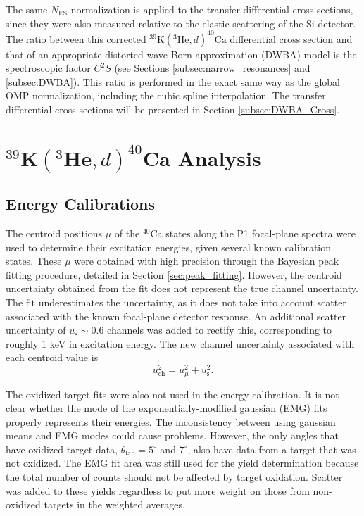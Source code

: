 The same $N_{\mathrm{ES}}$ normalization is applied to the transfer differential cross sections, since they were also measured relative to the elastic scattering of the Si detector. The ratio between this corrected $^{39}\mathrm{K}(^{3}\mathrm{He}, d)^{40}\mathrm{Ca}$ differential cross section and that of an appropriate distorted-wave Born approximation (DWBA) model is the spectroscopic factor $C^{2}S$ (see Sections \ref{subsec:narrow_resonances} and \ref{subsec:DWBA}). This ratio is performed in the exact same way as the global OMP normalization, including the cubic spline interpolation. The transfer differential cross sections will be presented in Section \ref{subsec:DWBA_Cross}.

\section{$^{39}\mathrm{\textbf{K}}(^{3}\mathrm{\textbf{He}},d)^{40}\mathrm{\textbf{Ca}}$ Analysis}

\subsection{Energy Calibrations} \label{subsec:cal}

The centroid positions $\mu$ of the $^{40}$Ca states along the P1 focal-plane spectra were used to determine their excitation energies, given several known calibration states. These $\mu$ were obtained with high precision through the Bayesian peak fitting procedure, detailed in Section \ref{sec:peak_fitting}. However, the centroid uncertainty obtained from the fit does not represent the true channel uncertainty. The fit underestimates the uncertainty, as it does not take into account scatter associated with the known focal-plane detector response. An additional scatter uncertainty of $u_{\mathrm{s}} \sim 0.6$ channels was added to rectify this, corresponding to roughly 1 keV in excitation energy. The new channel uncertainty associated with each centroid value is
\begin{equation}
u_{\mathrm{ch}}^{2} = u_{\mu}^{2} + u_{\mathrm{s}}^{2}.
\end{equation}

The oxidized target fits were also not used in the energy calibration. It is not clear whether the mode of the exponentially-modified gaussian (EMG) fits properly represents their energies. The inconsistency between using gaussian means and EMG modes could cause problems. However, the only angles that have oxidized target data, $\theta_{\mathrm{lab}} = 5^{\circ}$ and $7^{\circ}$, also have data from a target that was not oxidized. The EMG fit area was still used for the yield determination because the total number of counts should not be affected by target oxidation. Scatter was added to these yields regardless to put more weight on those from non-oxidized targets in the weighted averages.

